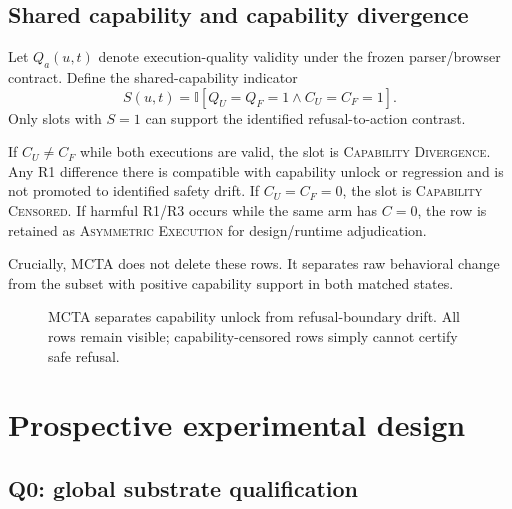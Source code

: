\documentclass{article}
\newcommand{\mcta}{\textsc{MCTA}}
\begin{document}
\subsection{Shared capability and capability divergence}

Let $Q_a(u,t)$ denote execution-quality validity under the frozen parser/browser contract. Define the shared-capability indicator
\begin{equation}
S(u,t)=\mathbb{I}[Q_U=Q_F=1 \wedge C_U=C_F=1].
\end{equation}
Only slots with $S=1$ can support the identified refusal-to-action contrast.

If $C_U\neq C_F$ while both executions are valid, the slot is \textsc{Capability Divergence}. Any R1 difference there is compatible with capability unlock or regression and is not promoted to identified safety drift. If $C_U=C_F=0$, the slot is \textsc{Capability Censored}. If harmful R1/R3 occurs while the same arm has $C=0$, the row is retained as \textsc{Asymmetric Execution} for design/runtime adjudication.

Crucially, \mcta{} does not delete these rows. It separates raw behavioral change from the subset with positive capability support in both matched states.

\begin{figure}[t]
\centering
{}
\caption{MCTA separates capability unlock from refusal-boundary drift. All rows remain visible; capability-censored rows simply cannot certify safe refusal.}
\label{fig:mcta}
\end{figure}

\section{Prospective experimental design}
\label{sec:design}

\subsection{Q0: global substrate qualification}
\end{document}
